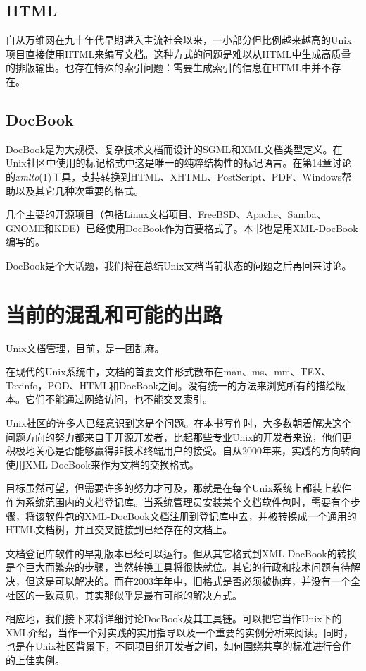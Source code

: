 \documentclass[12pt,oneside]{book}
\begin{document}
\begin{common-format}
\subsection{HTML}
自从万维网在九十年代早期进入主流社会以来，一小部分但比例越来越高的Unix项目直接使用HTML来编写文档。这种方式的问题是难以从HTML中生成高质量的排版输出。也存在特殊的索引问题：需要生成索引的信息在HTML中并不存在。

\subsection{DocBook}
DocBook是为大规模、复杂技术文档而设计的SGML和XML文档类型定义。在Unix社区中使用的标记格式中这是唯一的纯粹结构性的标记语言。在第14章讨论的\textit{xmlto}(1)工具，支持转换到HTML、XHTML、PostScript、PDF、Windows帮助以及其它几种次重要的格式。

几个主要的开源项目（包括Linux文档项目、FreeBSD、Apache、Samba、GNOME和KDE）已经使用DocBook作为首要格式了。本书也是用XML-DocBook编写的。

DocBook是个大话题，我们将在总结Unix文档当前状态的问题之后再回来讨论。

\section{当前的混乱和可能的出路}
Unix文档管理，目前，是一团乱麻。

在现代的Unix系统中，文档的首要文件形式散布在man、ms、mm、TEX、Texinfo，POD、HTML和DocBook之间。没有统一的方法来浏览所有的描绘版本。它们不能通过网络访问，也不能交叉索引。

Unix社区的许多人已经意识到这是个问题。在本书写作时，大多数朝着解决这个问题方向的努力都来自于开源开发者，比起那些专业Unix的开发者来说，他们更积极地关心是否能够赢得非技术终端用户的接受。自从2000年来，实践的方向转向使用XML-DocBook来作为文档的交换格式。

目标虽然可望，但需要许多的努力才可及，那就是在每个Unix系统上都装上软件作为系统范围内的文档登记库。当系统管理员安装某个文档软件包时，需要有个步骤，将该软件包的XML-DocBook文档注册到登记库中去，并被转换成一个通用的HTML文档树，并且交叉链接到已经存在的文档上。

文档登记库软件的早期版本已经可以运行。但从其它格式到XML-DocBook的转换是个巨大而繁杂的步骤，当然转换工具将很快就位。其它的行政和技术问题有待解决，但这是可以解决的。而在2003年年中，旧格式是否必须被抛弃，并没有一个全社区的一致意见，其实那似乎是最有可能的解决方式。

相应地，我们接下来将详细讨论DocBook及其工具链。可以把它当作Unix下的XML介绍，当作一个对实践的实用指导以及一个重要的实例分析来阅读。同时，也是在Unix社区背景下，不同项目组开发者之间，如何围绕共享的标准进行合作的上佳实例。


\end{common-format}
\end{document}
